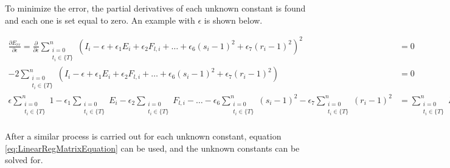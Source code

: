 To minimize the error, the partial derivatives of each unknown constant is found and each one is set equal to zero. An example with $\epsilon$ is shown below.

\begin{equation*}
    \begin{split}
        \frac{\partial E_{rr}}{\partial \epsilon}=
        \frac{\partial}{\partial \epsilon}\sum_{
                \substack{i=0\\ t_i\in \{ T \}}
            }^n \left(
            I_i
            -\epsilon
            +\epsilon_1 E_i
            +\epsilon_2 F_{l,i}
            +\dots
            +\epsilon_6 (s_i-1)^2
            +\epsilon_7 (r_i-1)^2
        \right)^2&=0\\
        -2\sum_{
                \substack{i=0\\ t_i\in \{ T \}}
            }^n \left(
            I_i
            -\epsilon
            +\epsilon_1 E_i
            +\epsilon_2 F_{l,i}
            +\dots
            +\epsilon_6(s_i-1)^2
            +\epsilon_7(r_i-1)^2
        \right)&=0\\
        \epsilon \sum_{\substack{i=0\\ t_i\in \{ T \}}}^n 1 
        -\epsilon_1 \sum_{\substack{i=0\\ t_i\in \{ T \}}} E_i
        -\epsilon_2 \sum_{\substack{i=0\\ t_i\in \{ T \}}} F_{l,i}
        -\dots
        -\epsilon_6 \sum_{\substack{i=0\\ t_i\in \{ T \}}}^n (s_i-1)^2
        -\epsilon_7 \sum_{\substack{i=0\\ t_i\in \{ T \}}}^n (r_i-1)^2
        &=
        \sum_{\substack{i=0\\ t_i\in \{ T \}}}^n I_i\\
    \end{split}
\end{equation*}

After a similar process is carried out for each unknown constant, equation \ref{eq:LinearRegMatrixEquation} can be used, and the unknown constants can be solved for.

